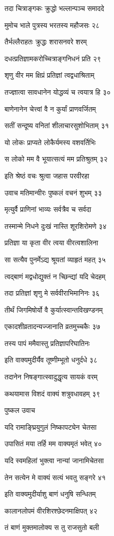 तदा चित्राङ्गकः क्रुद्धो भल्लान्पञ्च समाददे

मुमोच भाले पुत्रस्य भरतस्य महौजसः २८

तैर्भल्लैराहतः क्रुद्धः शरासनवरे शरम्

दधत्प्रतिज्ञामकरोच्चित्राङ्गनिधनं प्रति २९

शृणु वीर मम क्षिप्रं प्रतिज्ञां त्वद्वधाश्रिताम्

तज्ज्ञात्वा सावधानेन योद्धव्यं च त्वयात्र हि ३०

बाणेनानेन चेत्त्वां वै न कुर्यां प्राणवर्जितम्

सतीं सन्दूष्य वनितां शीलाचारसुशोभिताम् ३१

यो लोकः प्राप्यते लोकैर्यमस्य वशवर्तिभिः

स लोको मम वै भूयात्सत्यं मम प्रतिश्रुतम् ३२

इति श्रेष्ठं वचः श्रुत्वा जहास परवीरहा

उवाच मतिमान्वीरः पुष्कलं वचनं शुभम् ३३

मृत्युर्वै प्राणिनां भाव्यः सर्वत्रैव च सर्वदा

तस्मान्मे निधने दुःखं नास्ति शूरशिरोमणे ३४

प्रतिज्ञा या कृता वीर त्वया वीरत्वशालिना

सा सत्यैव पुनर्मेऽद्य श्रूयतां व्याहृतं महत् ३५

त्वद्बाणं मद्वधोद्युक्तं न च्छिन्द्यां यदि चेदहम्

तदा प्रतिज्ञां शृणु मे सर्ववीराभिमानिनः ३६

तीर्थं जिगमिषोर्यो वै कुर्यात्स्वान्तविखण्डनम्

एकादशीव्रतादन्यज्जानाति व्रतमुच्चकैः ३७

तस्य पापं ममैवास्तु प्रतिज्ञापरिघातिनः

इति वाक्यमुदीर्यैव तूष्णीम्भूतो धनुर्दधे ३८

तदानेन निषङ्गात्स्वादुद्धृत्य सायकं वरम्

कथयामास विशदं वाक्यं शत्रुवधावहम् ३९

पुष्कल उवाच

यदि रामाङ्घ्रियुगुलं निष्कापट्येन चेतसा

उपासितं मया तर्हि मम वाक्यमृतं भवेत् ४०

यदि स्वमहिलां भुक्त्वा नान्यां जानामिचेतसा

तेन सत्येन मे वाक्यं सत्यं भवतु सङ्गरे ४१

इति वाक्यमुदीर्याशु बाणं धनुषि सन्धितम्

कालानलोपमं वीरशिरश्छेदनमाक्षिपत् ४२

तं बाणं मुक्तमालोक्य स तु राजसुतो बली

